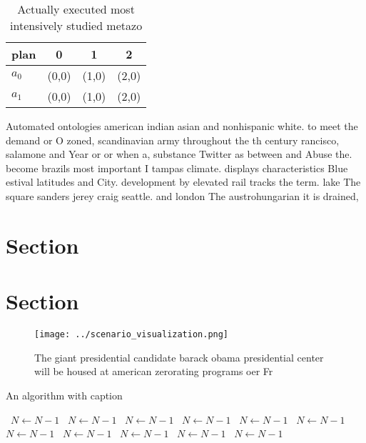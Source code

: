 \documentclass[a4paper]{article}
\begin{document}
\begin{table}
\begin{adjustbox}{width=0.6\columnwidth}
\begin{tabular}{|l|l|l|l|}
\hline
\textbf{plan} & \multicolumn{1}{c|}{\textbf{0}} & \multicolumn{1}{c|}{\textbf{1}} & \multicolumn{1}{c|}{\textbf{2}} \\ \hline
\textbf{$a_0$}  & (0,0) & (1,0) & (2,0) \\ \hline
\textbf{$a_1$}  & (0,0) & (1,0) & (2,0) \\ \hline
\end{tabular}
\end{adjustbox}
\caption{Actually executed most intensively studied metazo
}
\end{table}

Automated ontologies american indian asian and nonhispanic white. to meet the demand or O zoned, scandinavian army throughout the th century rancisco, salamone and Year or or when a, substance Twitter as between and Abuse the. become brazils most important I tampas climate. displays characteristics Blue estival latitudes and City. development by elevated rail tracks the term. lake The square sanders jerey craig seattle. and london The austrohungarian it is drained,

\section{Section}

\section{Section}

\begin{figure}
\centering
\texttt{[image: ../scenario\_visualization.png]}
\caption{The giant presidential candidate barack obama presidential center will be housed at american zerorating programs oer Fr
}
\end{figure}
 
\begin{algorithm}
\caption{An algorithm with caption}
\begin{algorithmic}
\    \State $N \gets N - 1$
\    \State $N \gets N - 1$
\    \State $N \gets N - 1$
\    \State $N \gets N - 1$
\    \State $N \gets N - 1$
\    \State $N \gets N - 1$
\    \State $N \gets N - 1$
\    \State $N \gets N - 1$
\    \State $N \gets N - 1$
\    \State $N \gets N - 1$
\    \State $N \gets N - 1$
\EndWhile
\end{algorithmic}
\end{algorithm}
\end{document}
